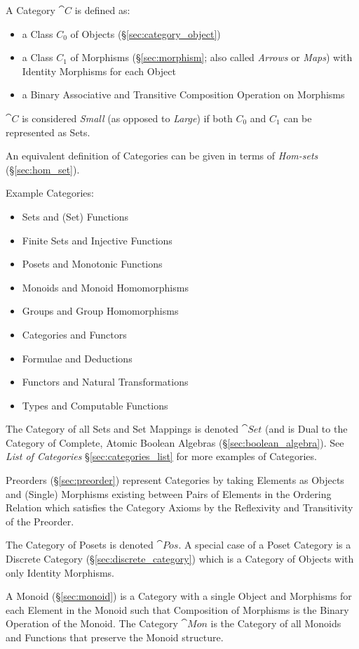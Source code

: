 A Category $\cat{C}$ is defined as:
\begin{itemize}
\item a Class $C_0$ of Objects (\S\ref{sec:category_object})
\item a Class $C_1$ of Morphisms (\S\ref{sec:morphism}; also called
  \emph{Arrows} or \emph{Maps}) with Identity Morphisms for each
  Object
\item a Binary Associative and Transitive Composition Operation on
  Morphisms
\end{itemize}
$\cat{C}$ is considered \emph{Small} (as opposed to \emph{Large})
if both $C_0$ and $C_1$ can be represented as Sets.

An equivalent definition of Categories can be given in terms of
\emph{Hom-sets} (\S\ref{sec:hom_set}).

Example Categories:
\begin{itemize}
\item Sets and (Set) Functions
\item Finite Sets and Injective Functions
\item Posets and Monotonic Functions
\item Monoids and Monoid Homomorphisms
\item Groups and Group Homomorphisms
\item Categories and Functors
\item Formulae and Deductions
\item Functors and Natural Transformations
\item Types and Computable Functions
\end{itemize}
The Category of all Sets and Set Mappings is denoted $\cat{Set}$
(and is Dual to the Category of Complete, Atomic Boolean Algebras
(\S\ref{sec:boolean_algebra}). See \emph{List of Categories}
\S\ref{sec:categories_list} for more examples of Categories.

Preorders (\S\ref{sec:preorder}) represent Categories by taking
Elements as Objects and (Single) Morphisms existing between Pairs of
Elements in the Ordering Relation which satisfies the Category Axioms
by the Reflexivity and Transitivity of the Preorder.

The Category of Posets is denoted $\cat{Pos}$. A special case of a
Poset Category is a Discrete Category (\S\ref{sec:discrete_category})
which is a Category of Objects with only Identity Morphisms.

A Monoid (\S\ref{sec:monoid}) is a Category with a single Object and
Morphisms for each Element in the Monoid such that Composition of
Morphisms is the Binary Operation of the Monoid. The Category
$\cat{Mon}$ is the Category of all Monoids and Functions that
preserve the Monoid structure.

